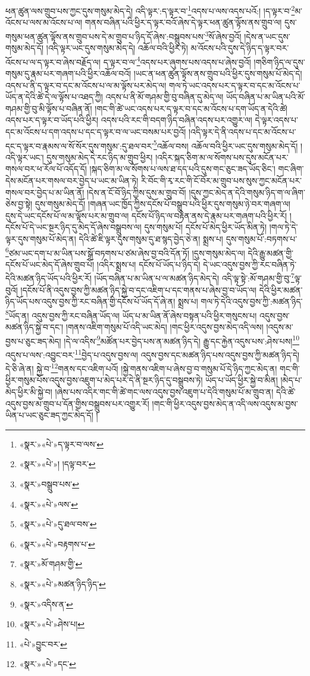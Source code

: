 ཕན་ཚུན་ལས་གྲུབ་པས་ཀྱང་དུས་གསུམ་མེད་དེ། འདི་ལྟར་:ད་ལྟར་བ་\footnote{«སྣར་»«པེ་»ད་ལྟར་བ་ལས་}འདས་པ་ལས་འདས་པའོ:། །ད་ལྟར་བ་\footnote{«སྣར་»«པེ་»། །དལྟ་བར་}མ་འོངས་པ་ལས་མ་འོངས་པ་ལ། གནས་བཞིན་པའི་ཕྱིར་ད་ལྟར་བའོ་ཞེས་དེ་ལྟར་ཕན་ཚུན་ལྟོས་ནས་གྲུབ་ལ། དུས་གསུམ་ཕན་ཚུན་ལྟོས་ནས་གྲུབ་པས་དེ་མ་གྲུབ་པ་ཉིད་དོ་ཞེས་:བསྒྲུབས་པས་\footnote{«སྣར་»བསྒྲུབ་པས་}སོ་ཞེས་བྱའོ། །དེས་ན་ཡང་དུས་གསུམ་མེད་དོ། །འདི་ལྟར་ཡང་དུས་གསུམ་མེད་དེ། འཆོལ་བའི་ཕྱིར་ཏེ། མ་འོངས་པའི་དུས་དེ་ཉིད་ད་ལྟར་བར་འོངས་པ་ལ་ད་ལྟར་བ་ཞེས་བརྗོད་ལ། ད་ལྟར་བ་ལ་\footnote{«སྣར་»«པེ་»ལས་}འདས་པར་ཞུགས་པས་འདས་པ་ཞེས་བྱའོ། །གཅིག་ཉིད་ལ་དུས་གསུམ་དུ་རྣམ་པར་གཞག་པའི་ཕྱིར་འཆོལ་བའོ། །ཡང་ན་ཕན་ཚུན་ལྟོས་ནས་གྲུབ་པའི་ཕྱིར་དུས་གསུམ་པོ་མེད་དེ། འདས་པ་ནི་ད་ལྟར་བ་དང་མ་འོངས་པ་ལ་མ་ལྟོས་པར་མེད་ལ། གལ་ཏེ་ཡང་འདས་པར་ད་ལྟར་བ་དང་མ་འོངས་པ་ཡོད་ན་དེའི་ཚེ་དེ་ལ་ལྟོས་པ་འཐད་ཀྱི། འདས་པ་ནི་མོ་གཤམ་གྱི་བུ་བཞིན་དུ་མེད་ལ། ཡོད་བཞིན་པ་མ་ཡིན་པའི་མོ་གཤམ་གྱི་བུ་མི་ལྟོས་པ་བཞིན་ནོ། །གང་གི་ཚེ་ཡང་འདས་པར་ད་ལྟར་བ་དང་མ་འོངས་པ་དག་ཡོད་ན་དེའི་ཚེ། འདས་པར་ད་ལྟར་བ་ཡོད་པའི་ཕྱིར། འདས་པའི་རང་གི་བདག་ཉིད་བཞིན་འདས་པར་འགྱུར་ལ། དེ་ལྟར་འདས་པ་དང་མ་འོངས་པ་དག་འདས་པ་དང་ད་ལྟར་བ་ལ་ཡང་བསམ་པར་བྱའོ། །འདི་ལྟར་དེ་ནི་འདས་པ་དང་མ་འོངས་པ་དང་ད་ལྟར་བ་རྣམས་ལ་སོ་སོར་དུས་གསུམ་:དུ་ཐལ་བར་\footnote{«སྣར་»«པེ་»དུ་ཐལ་བས་}འཆོལ་བས། འཆོལ་བའི་ཕྱིར་ཡང་དུས་གསུམ་མེད་དོ། །འདི་ལྟར་ཡང་། དུས་གསུམ་མེད་དེ་རང་ཉིད་མ་གྲུབ་ཕྱིར། །འདིར་སྐད་ཅིག་མ་ལ་སོགས་པས་དུས་མངོན་པར་གསལ་བར་ཕ་རོལ་པོ་འདོད་དོ། །སྐད་ཅིག་མ་ལ་སོགས་པ་ལས་ཐ་དད་པའི་དུས་གང་ཅུང་ཟད་ཡོད་ཅིང་། གང་ཞིག་དེས་མངོན་པར་གསལ་བར་བྱེད་པ་ཡང་མ་ཡིན་ཏེ། རི་བོང་གི་རྭ་རང་གི་ངོ་བོར་མ་གྲུབ་པས་སུས་ཀྱང་མངོན་པར་གསལ་བར་བྱེད་པ་མ་ཡིན་ནོ། །དེས་ན་ངོ་བོ་ཉིད་ཀྱིས་དུས་མ་གྲུབ་བོ། །དུས་ཀྱང་མེད་ན་དེའི་གསུམ་ཉིད་ག་ལ་ཞིག་ཅེས་བྱ་སྟེ། དུས་གསུམ་མེད་དོ། །གཞན་ཡང་ཁྱོད་ཀྱིས་དངོས་པོ་བསྒྲུབ་པའི་ཕྱིར་དུས་གསུམ་ཉེ་བར་གཞག་ལ། དུས་དེ་ཡང་དངོས་པོ་ལ་མ་ལྟོས་པར་མ་གྲུབ་ལ། དངོས་པོ་ཉིད་ལ་བརྟེན་ནས་དེ་རྣམ་པར་གཞག་པའི་ཕྱིར་རོ། །དངོས་པོ་དེ་ཡང་སྔར་ཉིད་དུ་མེད་དོ་ཞེས་བསྒྲུབས་ལ། དུས་གསུམ་པོ། དངོས་པོ་མེད་ཕྱིར་ཡོད་མིན་ཏེ། །གལ་ཏེ་དེ་ལྟར་དུས་གསུམ་པོ་མེད་ན། དེའི་ཚེ་ཇི་ལྟར་དུས་གསུམ་དུ་ཐ་སྙད་བྱེད་ཅེ་ན། སྨྲས་པ། དུས་གསུམ་པོ་:བཏགས་པ་\footnote{«སྣར་»«པེ་»བརྟགས་པ་}ཙམ་ཡང་དག་པ་མ་ཡིན་པས་སྒྲོ་བཏགས་པ་ཙམ་ཞེས་བྱ་བའི་དོན་ཏོ། །དུས་གསུམ་མེད་ལ། དེའི་རྒྱུ་མཚན་གྱི་དངོས་པོ་ཡང་མེད་དོ་ཞེས་གྲུབ་པོ། །འདིར་སྨྲས་པ། དངོས་པོ་ཡོད་པ་ཉིད་དེ། དེ་ཡང་འདུས་བྱས་ཀྱི་རང་བཞིན་ཏེ་དེའི་མཚན་ཉིད་ཡོད་པའི་ཕྱིར་རོ། །ཡོད་བཞིན་པ་མ་ཡིན་པ་ལ་མཚན་ཉིད་མེད་དེ། འདི་ལྟ་སྟེ་:མོ་གཤམ་གྱི་བུ་\footnote{«སྣར་»མོ་གཤམ་གྱི་}ལྟ་བུའོ། །དངོས་པོ་ནི་འདུས་བྱས་ཀྱི་མཚན་ཉིད་སྐྱེ་བ་དང་འཇིག་པ་དང་གནས་པ་ཞེས་བྱ་བ་ཡོད་ལ། དེའི་ཕྱིར་མཚན་ཉིད་ཡོད་པས་འདུས་བྱས་ཀྱི་རང་བཞིན་གྱི་དངོས་པོ་ཡོད་དོ་ཞེ་ན། སྨྲས་པ། གལ་ཏེ་དེའི་འདུས་བྱས་ཀྱི་:མཚན་ཉིད་\footnote{«སྣར་»«པེ་»མཚན་ཉིད་ཉིད་}ཡོད་ན། འདུས་བྱས་ཀྱི་རང་བཞིན་ཡོད་ལ། ཡོད་པ་མ་ཡིན་ནོ་ཞེས་བསྟན་པའི་ཕྱིར་གསུངས་པ། འདུས་བྱས་མཚན་ཉིད་སྐྱེ་བ་དང་། །གནས་འཇིག་གསུམ་པོ་འདི་ཡང་མེད། །གང་ཕྱིར་འདུས་བྱས་མེད་འདི་ལས། །འདུས་མ་བྱས་པ་ཅུང་ཟད་མེད། །དེ་ལ་འདིས་\footnote{«སྣར་»འདིས་ན་}མཚོན་པར་བྱེད་པས་ན་མཚན་ཉིད་དེ། རྒྱུ་དང་རྐྱེན་འདུས་པས་:ཤེས་པས།\footnote{«སྣར་»«པེ་»ཤེས་པ།} འདུས་པ་ལས་:འབྱུང་བར་\footnote{«པེ་»བྱུང་བར་}བྱེད་པ་འདུས་བྱས་ལ། འདུས་བྱས་དང་མཚན་ཉིད་པས་འདུས་བྱས་ཀྱི་མཚན་ཉིད་དེ། དེ་ཅི་ཞེ་ན། སྐྱེ་བ་\footnote{«སྣར་»«པེ་»དང་}གནས་དང་འཇིག་པའོ། །སྐྱེ་གནས་འཇིག་པ་ཞེས་བྱ་བ་གསུམ་པོ་དེ་ཉིད་ཀྱང་མེད་ན། གང་གི་ཕྱིར་གསུམ་པོས་འདུས་བྱས་འཇུག་པ་མེད་པར་དེ་ནི་སྔར་ཉིད་དུ་བསྒྲུབས་ཏེ། ཡོད་པ་ཡོད་ཕྱིར་སྐྱེ་བ་མིན། །མེད་པ་མེད་ཕྱིར་མི་སྐྱེ་བ། །ཞེས་པས་འདིར་གང་གི་ཚེ་གང་ལས་འདུས་བྱས་འཇུག་པ་དེའི་གསུམ་པོ་མ་གྲུབ་ན། དེའི་ཚེ་འདུས་བྱས་མ་གྲུབ་པ་དོན་གྱིས་བསྒྲུབས་པར་འགྱུར་རོ། །གང་གི་ཕྱིར་འདུས་བྱས་མེད་ན་འདི་ལས་འདུས་མ་བྱས་ཡིན་པ་ཡང་ཅུང་ཟད་ཀྱང་མེད་དོ། །
